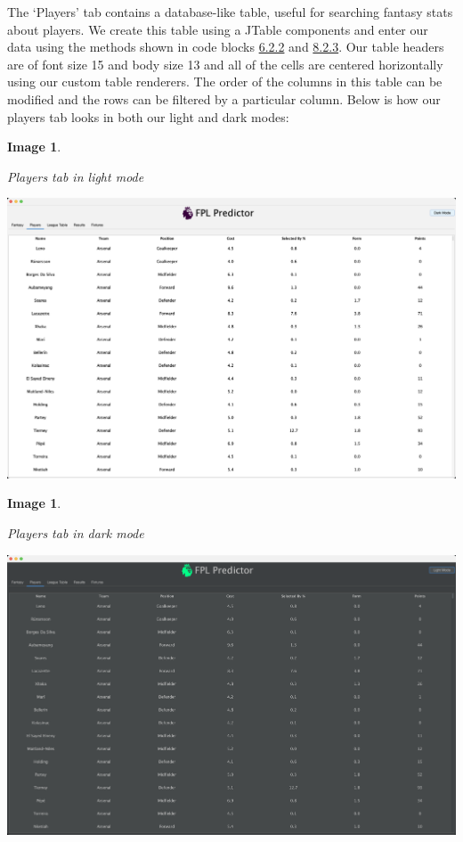 \documentclass[12pt, a4paper, oneside]{book}
\newtheorem{image}[theorem]{Image}
\numberwithin{equation}{section}
\begin{document}
The `Players' tab contains a database-like table, useful for searching fantasy stats about players. We create this table using a JTable components and enter our data using the methods shown in code blocks \hyperref[Defining a DefaultTableModel]{6.2.2} and \hyperref[Creating a DataTable object]{8.2.3}. Our table headers are of font size 15 and body size 13 and all of the cells are centered horizontally using our custom table renderers. The order of the columns in this table can be modified and the rows can be filtered by a particular column. Below is how our players tab looks in both our light and dark modes:

\begin{image} \label{Players tab in light mode}

  Players tab in light mode

  \vspace{0.5cm}

  \centerline{\includegraphics[width=1\textwidth]{images/gui/players-tab/light.png}}

\end{image}

\begin{image} \label{Players tab in dark mode}

  Players tab in dark mode

  \vspace{0.5cm}

  \centerline{\includegraphics[width=1\textwidth]{images/gui/players-tab/dark.png}}

\end{image}
\end{document}

